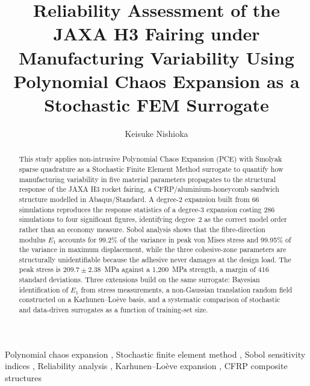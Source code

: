 \documentclass[review,3p,times,12pt,nopreprintline]{elsarticle}
\begin{document}
\begin{frontmatter}

    \title{Reliability Assessment of the JAXA H3 Fairing under Manufacturing
    Variability Using Polynomial Chaos Expansion as a Stochastic FEM Surrogate}

    \author[a]{Keisuke Nishioka}
    \address[a]{M.Sc.\ Mechanical Engineering,
    Leibniz Universit\"{a}t Hannover, Germany}

    \begin{abstract}
        This study applies non-intrusive Polynomial Chaos Expansion (PCE) with Smolyak
        sparse quadrature as a Stochastic Finite Element Method surrogate to quantify how
        manufacturing variability in five material parameters propagates to the structural
        response of the JAXA H3 rocket fairing, a CFRP/aluminium-honeycomb sandwich
        structure modelled in Abaqus/Standard. A degree-2 expansion built from 66
        simulations reproduces the response statistics of a degree-3 expansion costing 286
        simulations to four significant figures, identifying degree~2 as the correct model
        order rather than an economy measure. Sobol analysis shows that the fibre-direction
        modulus $E_1$ accounts for 99.2\% of the variance in peak von Mises stress and
        99.95\% of the variance in maximum displacement, while the three cohesive-zone
        parameters are structurally unidentifiable because the adhesive never damages at the
        design load. The peak stress is $209.7 \pm 2.38$~MPa against a 1{,}200~MPa strength,
        a margin of 416 standard deviations. Three extensions build on the same surrogate:
        Bayesian identification of $E_1$ from stress measurements, a non-Gaussian
        translation random field constructed on a Karhunen--Lo\`{e}ve basis, and a
        systematic comparison of stochastic and data-driven surrogates as a function of
        training-set size.
    \end{abstract}

    \begin{keyword}
        Polynomial chaos expansion \sep
        Stochastic finite element method \sep
        Sobol sensitivity indices \sep
        Reliability analysis \sep
        Karhunen--Lo\`{e}ve expansion \sep
        CFRP composite structures
    \end{keyword}

\end{frontmatter}
\end{document}
